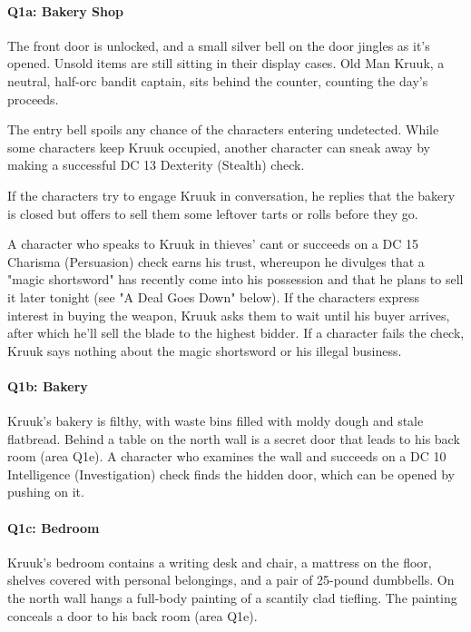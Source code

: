 \documentclass[10pt,a4paper,twoside,twocolumn,openany,nodeprecatedcode]{dndbook}
\begin{document}
\paragraph{Q1a: Bakery Shop}
The front door is unlocked, and a small silver bell on the door jingles as it's opened. Unsold items are still sitting in their display cases. Old Man Kruuk, a neutral, half-orc bandit captain, sits behind the counter, counting the day's proceeds.

The entry bell spoils any chance of the characters entering undetected. While some characters keep Kruuk occupied, another character can sneak away by making a successful DC 13 Dexterity (Stealth) check.

If the characters try to engage Kruuk in conversation, he replies that the bakery is closed but offers to sell them some leftover tarts or rolls before they go.

A character who speaks to Kruuk in thieves' cant or succeeds on a DC 15 Charisma (Persuasion) check earns his trust, whereupon he divulges that a "magic shortsword" has recently come into his possession and that he plans to sell it later tonight (see "A Deal Goes Down" below). If the characters express interest in buying the weapon, Kruuk asks them to wait until his buyer arrives, after which he'll sell the blade to the highest bidder. If a character fails the check, Kruuk says nothing about the magic shortsword or his illegal business.



\paragraph{Q1b: Bakery}
Kruuk's bakery is filthy, with waste bins filled with moldy dough and stale flatbread. Behind a table on the north wall is a secret door that leads to his back room (area Q1e). A character who examines the wall and succeeds on a DC 10 Intelligence (Investigation) check finds the hidden door, which can be opened by pushing on it.

\paragraph{Q1c: Bedroom}
Kruuk's bedroom contains a writing desk and chair, a mattress on the floor, shelves covered with personal belongings, and a pair of 25-pound dumbbells. On the north wall hangs a full-body painting of a scantily clad tiefling. The painting conceals a door to his back room (area Q1e).
\end{document}
